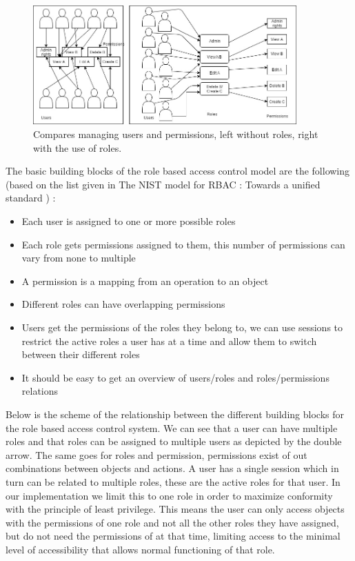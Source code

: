 \begin{figure}[ht]
    \centering
    \includegraphics[width=0.9\textwidth, height=0.50\textwidth]{Img/self/RBACvsNonRBAC.jpg}
    \caption{Compares managing users and permissions, left without roles, right with the use of roles.}
\end{figure}
The basic building blocks of the role based access control model are the following (based on the list given in The NIST model for RBAC : Towards a unified standard \cite{Overview1}) :
\begin{itemize}
    \item Each user is assigned to one or more possible roles
    \item Each role gets permissions assigned to them, this number of permissions can vary from none to multiple
    \item A permission is a mapping from an operation to an object
    \item Different roles can have overlapping permissions
    \item Users get the permissions of the roles they belong to, we can use sessions to restrict the active roles a user has at a time and allow them to switch between their different roles
    \item It should be easy to get an overview of users/roles and roles/permissions relations
\end{itemize}
Below is the scheme of the relationship between the different building blocks for the role based access control system. 
We can see that a user can have multiple roles and that roles can be assigned to multiple users as depicted by the double arrow.
The same goes for roles and permission, permissions exist of out combinations between objects and actions.
A user has a single session which in turn can be related to multiple roles, these are the active roles for that user.
In our implementation we limit this to one role in order to maximize conformity with the principle of least privilege. 
This means the user can only access objects with the permissions of one role and not all the other roles they have assigned, but do not need the permissions of at that time, limiting access to the minimal level of accessibility that allows normal functioning of that role. 


